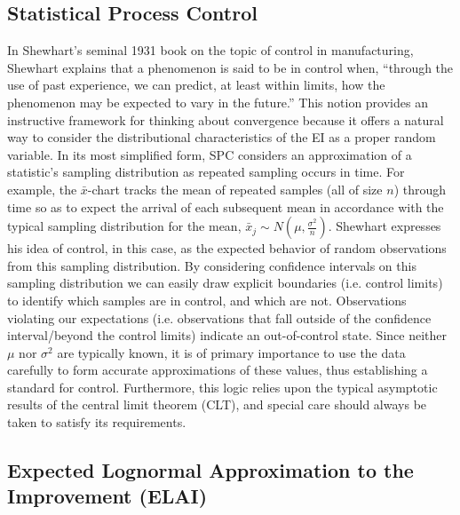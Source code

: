 \documentclass[12pt]{article}
\begin{document}
%
%
\subsection{Statistical Process Control}
%
%

%
In Shewhart's seminal 1931 book \cite{shewhartBook} on the topic of control in manufacturing, Shewhart explains that a phenomenon is said to be in control when, ``through the use of past experience, we can predict, at least within limits, how the phenomenon may be expected to vary in the future.''
This notion provides an instructive framework for thinking about convergence because it offers a natural way to consider the distributional characteristics of the EI as a proper random variable. 
In its most simplified form, SPC considers an approximation of a statistic's sampling distribution as repeated sampling occurs in time.
For example, the $\bar x$-chart tracks the mean of repeated samples (all of size $n$) through time so as to expect the arrival of each subsequent mean in accordance with the typical sampling distribution for the mean, $\bar{x}_j \sim N\left(\mu, \frac{\sigma^2}{n}\right)$.   
%
Shewhart expresses his idea of control, in this case, as the expected behavior of random observations from this sampling distribution.
%
By considering confidence intervals on this sampling distribution we can easily draw explicit boundaries (i.e. control limits) to identify which samples are in control, and which are not.
%
Observations violating our expectations (i.e. observations that fall outside of the confidence interval/beyond the control limits) indicate an out-of-control state.
%
Since neither $\mu$ nor $\sigma^2$ are typically known, it is of primary importance to use the data carefully to form accurate approximations of these values, thus establishing a standard for control.
%
Furthermore, this logic relies upon the typical asymptotic results of the central limit theorem (CLT), and special care should always be taken to satisfy its requirements.

%
%
\subsection{Expected Lognormal Approximation to the Improvement (ELAI)}
%
%
\end{document}
